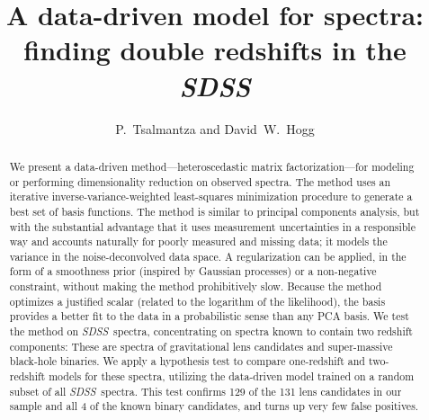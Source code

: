 \documentclass[12pt,preprint]{aastex}
\newcommand{\project}[1]{\textsl{#1}}
\newcommand{\sdss}{\project{SDSS}}
\newcommand{\SDSS}{\sdss}
\begin{document}
\title{A data-driven model for spectra:\\
       finding double redshifts in the \SDSS}
\author{P.~Tsalmantza and David~W.~Hogg}

\begin{abstract}
We present a data-driven method---heteroscedastic matrix
factorization---for modeling or performing dimensionality reduction on
observed spectra.  The method uses an iterative
inverse-variance-weighted least-squares minimization procedure to
generate a best set of basis functions.  The method is similar to
principal components analysis, but with the substantial advantage that
it uses measurement uncertainties in a responsible way and accounts
naturally for poorly measured and missing data; it models the variance
in the noise-deconvolved data space.  A regularization can be applied,
in the form of a smoothness prior (inspired by Gaussian processes) or
a non-negative constraint, without making the method prohibitively
slow.  Because the method optimizes a justified scalar (related to the
logarithm of the likelihood), the basis provides a better fit to the
data in a probabilistic sense than any PCA basis.  We test the method
on \SDSS\ spectra, concentrating on spectra known to contain two
redshift components: These are spectra of gravitational lens
candidates and super-massive black-hole binaries. We apply a
hypothesis test to compare one-redshift and two-redshift models for
these spectra, utilizing the data-driven model trained on a random
subset of all \SDSS\ spectra.  This test confirms 129 of the 131 lens
candidates in our sample and all 4 of the known binary candidates, and
turns up very few false positives.
\end{abstract}

\end{document}
